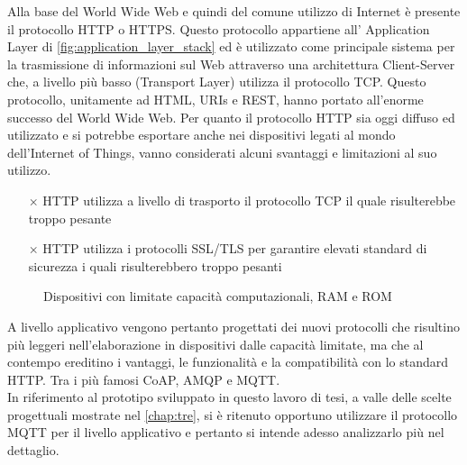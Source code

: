 Alla base del World Wide Web e quindi del comune utilizzo di Internet è presente il protocollo HTTP o HTTPS. Questo protocollo appartiene all' Application Layer di \autoref{fig:application_layer_stack} ed è utilizzato come principale sistema per la trasmissione di informazioni sul Web attraverso una architettura Client-Server che, a livello più basso (Transport Layer) utilizza il protocollo TCP.
Questo protocollo, unitamente ad HTML, URIs e REST, hanno portato all'enorme successo del World Wide Web. \cite{book:slide_Grieco}
Per quanto il protocollo HTTP sia oggi diffuso ed utilizzato e si potrebbe esportare anche nei dispositivi legati al mondo dell'Internet of Things, vanno considerati alcuni svantaggi e limitazioni al suo utilizzo.
\begin{itemize}
	\item[$\times$] HTTP utilizza a livello di trasporto il protocollo TCP il quale risulterebbe troppo pesante
	\item[$\times$] HTTP utilizza i protocolli SSL/TLS per garantire elevati standard di sicurezza i quali risulterebbero troppo pesanti
\end{itemize}
\begin{figure}%
	\centering
	\qquad
	\caption{Dispositivi con limitate capacità computazionali, RAM e ROM}%
	\label{fig:application_layer_devices}%
\end{figure}
A livello applicativo vengono pertanto progettati dei nuovi protocolli che risultino più leggeri nell'elaborazione in dispositivi dalle capacità limitate, ma che al contempo ereditino i vantaggi, le funzionalità e la compatibilità con lo standard HTTP. Tra i più famosi CoAP, AMQP e MQTT.\\
In riferimento al prototipo sviluppato in questo lavoro di tesi, a valle delle scelte progettuali mostrate nel \autoref{chap:tre}, si è ritenuto opportuno utilizzare il protocollo MQTT per il livello applicativo e pertanto si intende adesso analizzarlo più nel dettaglio.

